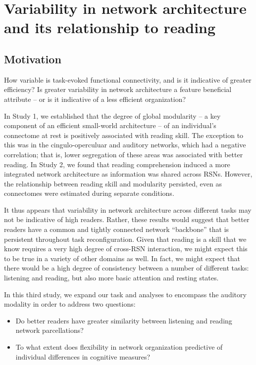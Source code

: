\chapter{Variability in network architecture and its relationship to reading}

\section{Motivation}

How variable is task-evoked functional connectivity, and is it indicative of greater efficiency? Is greater variability in network architecture a feature beneficial attribute -- or is it indicative of a less efficient organization?

In Study 1, we established that the degree of global modularity -- a key component of an efficient small-world architecture -- of an individual's connectome at rest is positively associated with reading skill. The exception to this was in the cingulo-operculuar and auditory networks, which had a negative correlation; that is, lower segregation of these areas was associated with better reading. In Study 2, we found that reading comprehension induced a more integrated network architecture as information was shared across RSNs. However, the relationship between reading skill and modularity persisted, even as connectomes were estimated during separate conditions. 

It thus appears that variability in network architecture across different tasks may not be indicative of high readers. Rather, these results would suggest that better readers have a common and tightly connected network ``backbone'' that is persistent throughout task reconfiguration. Given that reading is a skill that we know requires a very high degree of cross-RSN interaction, we might expect this to be true in a variety of other domains as well. In fact, we might expect that there would be a high degree of consistency between a number of different tasks: listening and reading, but also more basic attention and resting states. 

In this third study, we expand our task and analyses to encompass the auditory modality in order to address two questions:

\begin{itemize} 
	\item Do better readers have greater similarity between listening and reading network parcellations?
	\item To what extent does flexibility in network organization predictive of individual differences in cognitive measures?
\end{itemize} 

